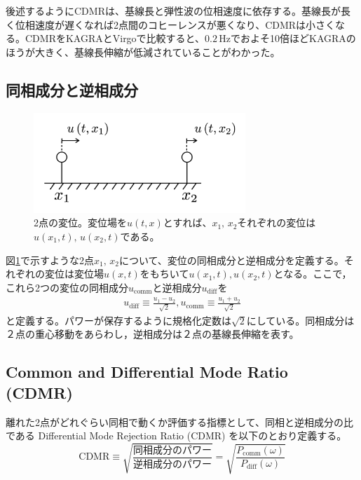\documentclass[a4paper,12pt]{book}
\begin{document}
後述するようにCDMRは、基線長と弾性波の位相速度に依存する。基線長が長く位相速度が遅くなれば2点間のコヒーレンスが悪くなり、CDMRは小さくなる。CDMRをKAGRAとVirgoで比較すると、$0.2\, \mathrm{Hz}$でおよそ10倍ほどKAGRAのほうが大きく、基線長伸縮が低減されていることがわかった。

\subsection{同相成分と逆相成分}
\begin{figure}[H]
  \begin{center}
    \includegraphics[width=8.0cm]{./img_cdmr_xarm.png}
  \end{center}
  \caption{2点の変位。変位場を$u(t,x)$とすれば、$x_1,\,x_2$それぞれの変位は$u(x_1,t),\,u(x_2,t)$である。}\label{img:img_diffcomm}
\end{figure}

図\ref{img:img_diffcomm}で示すような2点$x_1,\,x_2$について、変位の同相成分と逆相成分を定義する。それぞれの変位は変位場$u(x,t)$をもちいて$u(x_1,t),u(x_2,t)$となる。ここで，これら2つの変位の同相成分$u_{\mathrm{comm}}$と逆相成分$u_\mathrm{diff}$を
\begin{eqnarray}\label{eq:eq22}
  u_{\mathrm{diff}} \equiv \frac{u_{1}-u_{2}}{\sqrt{2}},
  u_{\mathrm{comm}}  \equiv \frac{u_{1}+u_{2}}{\sqrt{2}}
\end{eqnarray}
と定義する。パワーが保存するように規格化定数は$\sqrt{2}$にしている。同相成分は２点の重心移動をあらわし，逆相成分は２点の基線長伸縮を表す。


\subsection{Common and Differential Mode Ratio (CDMR)}
離れた2点がどれぐらい同相で動くか評価する指標として、同相と逆相成分の比である Differential Mode Rejection Ratio (CDMR) を以下のとおり定義する。
\begin{equation}
  \boxed{\mathrm{CDMR} \equiv \sqrt{\frac{同相成分のパワー}{逆相成分のパワー}} = \sqrt{\frac{P_{\mathrm{comm}}(\omega)}{P_{\mathrm{diff}}(\omega)}}} \label{eq:eq23}
\end{equation}
\end{document}
